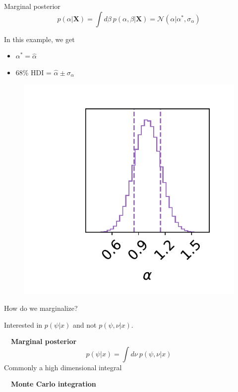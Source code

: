 \documentclass[
aspectratio=169,
14pt,
professionalfonts
]{beamer}
\newcommand{\arrow}{~\ding{220}~}
\begin{document}
\begin{frame}{Marginal posterior}
\vspace{-1cm}
    $$p(\alpha|\boldsymbol{X}) = \int d\beta ~ p(\alpha, \beta|\boldsymbol{X}) = \mathcal{N}(\alpha | \alpha^*, \sigma_{\alpha})$$
    \begin{minipage}{0.4\linewidth}
    In this example, we get
        \begin{itemize}
            \item $\alpha^* = \hat \alpha$
            \item 68\% HDI = $\hat \alpha \pm \sigma_{\alpha}$
        \end{itemize}
    \end{minipage}
    \begin{minipage}{0.59\linewidth}
    \begin{figure}
        \centering
        \includegraphics[width=0.7\linewidth]{../plots/marginal_posterior.pdf}
    \end{figure}
    \end{minipage}
\end{frame}

\begin{frame}{How do we marginalize?}
    \begin{center}
        Interested in $p(\psi | x)$ and not $p(\psi, \nu | x)$.
    \end{center}

    \arrow \textbf{Marginal posterior}
    $$
    p(\psi | x) = \int d\nu ~ p(\psi, \nu | x)
    $$
    Commonly a high dimensional integral 
    \begin{center}
        \arrow \textbf{Monte Carlo integration}
    \end{center}
\end{frame}
\end{document}
